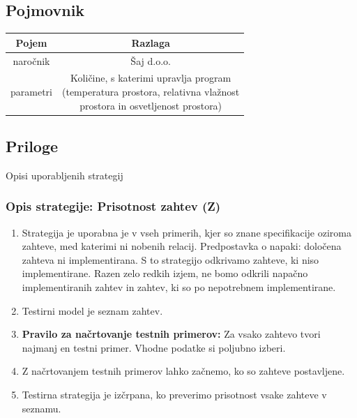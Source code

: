 \documentclass[a4paper,12pt]{article}
\newcommand{\mlc}[1]{\raisebox{0ex}{\makecell{#1}}}
\begin{document}
\newpage

	\subsection{Pojmovnik}
		
		\begin{center}
				\begin{tabular}{|c|c|}
					\hline
				    \rowcolor{purple!30!}Pojem&Razlaga\\
				    \hline
					naročnik&Šaj d.o.o.\\
					\hline
					parametri&\mlc{Količine, s katerimi upravlja program \\(temperatura prostora, relativna vlažnost \\ prostora in osvetljenost prostora)}\\
					\hline
			\end{tabular}
		\end{center}


	\subsection{Priloge}

		\qquad \qquad Opisi uporabljenih strategij

		\subsubsection{Opis strategije: Prisotnost zahtev (Z)}

			\begin{enumerate}
				\item Strategija je uporabna je v vseh primerih, kjer so znane specifikacije 
					  oziroma zahteve, med katerimi ni nobenih relacij. Predpostavka o napaki: določena zahteva 
					  ni implementirana. S to strategijo odkrivamo zahteve, ki niso implementirane. 
					  Razen zelo redkih izjem, ne bomo odkrili napačno implementiranih zahtev in 
					  zahtev, ki so po nepotrebnem implementirane.
    			
			 	\item Testirni model je seznam zahtev.
				\item \textbf{Pravilo za načrtovanje testnih primerov:} Za vsako zahtevo tvori najmanj en testni primer. 
					  Vhodne podatke si poljubno izberi.
				\item Z načrtovanjem testnih primerov lahko začnemo, ko so zahteve postavljene.
				\item Testirna strategija je izčrpana, ko preverimo prisotnost vsake zahteve v seznamu.
			\end{enumerate}
\end{document}
